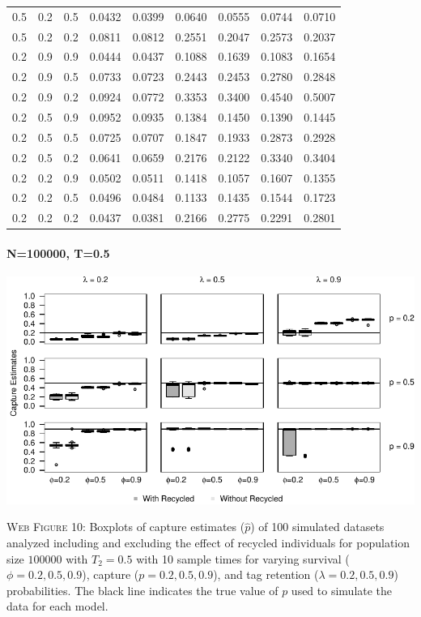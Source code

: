 \documentclass[]{article}
\let\oldparagraph\paragraph
\renewcommand{\paragraph}[1]{\oldparagraph{#1}\mbox{}}
\begin{document}
\begin{table}[ht]
{\begin{tabular}{rrrrrrrrr}
  0.5 & 0.2 & 0.5 & 0.0432 & 0.0399 & 0.0640 & 0.0555 & 0.0744 & 0.0710 \\ 
  0.5 & 0.2 & 0.2 & 0.0811 & 0.0812 & 0.2551 & 0.2047 & 0.2573 & 0.2037 \\ 
  0.2 & 0.9 & 0.9 & 0.0444 & 0.0437 & 0.1088 & 0.1639 & 0.1083 & 0.1654 \\ 
  0.2 & 0.9 & 0.5 & 0.0733 & 0.0723 & 0.2443 & 0.2453 & 0.2780 & 0.2848 \\ 
  0.2 & 0.9 & 0.2 & 0.0924 & 0.0772 & 0.3353 & 0.3400 & 0.4540 & 0.5007 \\ 
  0.2 & 0.5 & 0.9 & 0.0952 & 0.0935 & 0.1384 & 0.1450 & 0.1390 & 0.1445 \\ 
  0.2 & 0.5 & 0.5 & 0.0725 & 0.0707 & 0.1847 & 0.1933 & 0.2873 & 0.2928 \\ 
  0.2 & 0.5 & 0.2 & 0.0641 & 0.0659 & 0.2176 & 0.2122 & 0.3340 & 0.3404 \\ 
  0.2 & 0.2 & 0.9 & 0.0502 & 0.0511 & 0.1418 & 0.1057 & 0.1607 & 0.1355 \\ 
  0.2 & 0.2 & 0.5 & 0.0496 & 0.0484 & 0.1133 & 0.1435 & 0.1544 & 0.1723 \\ 
  0.2 & 0.2 & 0.2 & 0.0437 & 0.0381 & 0.2166 & 0.2775 & 0.2291 & 0.2801 \\ 
   \hline
\end{tabular}
}
\endgroup
\end{table}

\newpage

\paragraph{N=100000, T=0.5}\label{n100000-t0.5-1}

\includegraphics{Appendix_BW_files/figure-latex/figure10_capture_GJSTL3-1.pdf}

\textsc{Web Figure 10:} Boxplots of capture estimates (\(\hat{p}\)) of
100 simulated datasets analyzed including and excluding the effect of recycled
individuals for population size \(100000\) with \(T_2=0.5\) with 10 sample times for varying survival (\(\phi=0.2,0.5,0.9\)), capture
(\(p=0.2,0.5,0.9\)), and tag retention (\(\lambda=0.2,0.5,0.9\))
probabilities. The black line indicates the true value of \(p\) used to
simulate the data for each model.
\end{document}
